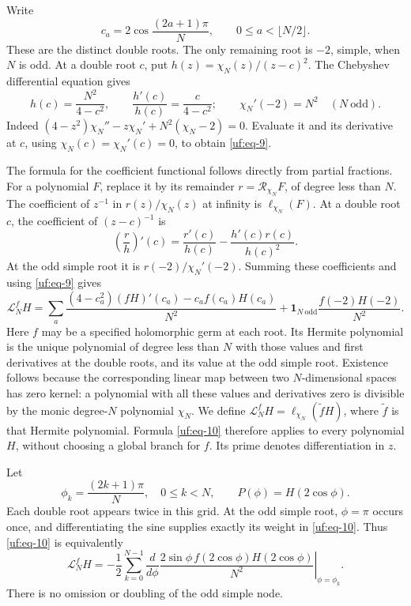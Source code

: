 \documentclass[11pt]{article}
\numberwithin{equation}{section}
\theoremstyle{definition}\newtheorem{definition}[theorem]{Definition}
\theoremstyle{remark}\newtheorem{remark}[theorem]{Remark}
\begin{document}
Write \begin{equation}\label{uf:eq-8}
c_a=2\cos\frac{(2a+1)\pi}{N},\qquad
 0\le a<\lfloor N/2\rfloor.
\end{equation} These are the distinct double roots. The only remaining root is
\(-2\), simple, when \(N\) is odd. At a double root \(c\), put
\(h(z)=\chi_N(z)/(z-c)^2\). The Chebyshev differential equation gives \begin{equation}\label{uf:eq-9}
h(c)=\frac{N^2}{4-c^2},\qquad
 \frac{h'(c)}{h(c)}=\frac{c}{4-c^2};
 \qquad \chi_N'(-2)=N^2\quad(N\ \mathrm{odd}).
\end{equation} Indeed \((4-z^2)\chi_N''-z\chi_N'+N^2(\chi_N-2)=0\). Evaluate it and
its derivative at \(c\), using \(\chi_N(c)=\chi_N'(c)=0\), to obtain
\eqref{uf:eq-9}.

The formula for the coefficient functional follows directly from
partial fractions. For a polynomial $F$, replace it by its remainder
$r=\mathcal R_{\chi_N}F$, of degree less than $N$. The coefficient of
$z^{-1}$ in $r(z)/\chi_N(z)$ at infinity is $\ell_{\chi_N}(F)$.
At a double root $c$, the coefficient of $(z-c)^{-1}$ is
\[
 \left(\frac r h\right)'(c)
 =\frac{r'(c)}{h(c)}-\frac{h'(c)r(c)}{h(c)^2}.
\]
At the odd simple root it is $r(-2)/\chi_N'(-2)$. Summing these
coefficients and using \eqref{uf:eq-9} gives
\begin{equation}\label{uf:eq-10}
\mathcal L_N^fH=
 \sum_a\frac{(4-c_a^2)(fH)'(c_a)-c_af(c_a)H(c_a)}{N^2}
 +\mathbf1_{N\ \mathrm{odd}}\frac{f(-2)H(-2)}{N^2}.
\end{equation}
Here $f$ may be a specified holomorphic germ at each root. Its Hermite
polynomial is the unique polynomial of degree less than $N$ with those
values and first derivatives at the double roots, and its value at the
odd simple root. Existence follows because the corresponding linear map
between two $N$-dimensional spaces has zero kernel: a polynomial with
all these values and derivatives zero is divisible by the monic degree-$N$ polynomial
$\chi_N$. We define $\mathcal L_N^fH=\ell_{\chi_N}(\widetilde f H)$,
where $\widetilde f$ is that Hermite polynomial. Formula \eqref{uf:eq-10}
therefore applies to every polynomial $H$, without choosing a global
branch for $f$. Its prime denotes differentiation in $z$.

Let \begin{equation}\label{uf:eq-11}
\phi_k=\frac{(2k+1)\pi}{N},\quad 0\le k<N,\qquad
 P(\phi)=H(2\cos\phi).
\end{equation} Each double root appears twice in this grid. At the odd simple root,
\(\phi=\pi\) occurs once, and differentiating the sine supplies exactly
its weight in \eqref{uf:eq-10}. Thus \eqref{uf:eq-10} is equivalently \begin{equation}\label{uf:eq-12}
\mathcal L_N^fH
 =-\frac1{2}\sum_{k=0}^{N-1}
       \left.\frac{d}{d\phi}
       \frac{2\sin\phi\,f(2\cos\phi)H(2\cos\phi)}{N^2}
       \right|_{\phi=\phi_k}.
\end{equation} There is no omission or doubling of the odd simple node.
\end{document}
